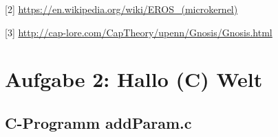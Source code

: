 \documentclass[numbers=noendperiod]{scrartcl}
\begin{document}
[2] \url{https://en.wikipedia.org/wiki/EROS_(microkernel)}

[3] \url{http://cap-lore.com/CapTheory/upenn/Gnosis/Gnosis.html}

\section*{Aufgabe 2: Hallo (C) Welt}

\subsection*{C-Programm addParam.c}

\begin{mdframed}[linecolor=bg,backgroundcolor=bg]
	\inputminted[mathescape,breaklines,linenos,numbersep=5pt,tabsize=3]{c}{addParam.c}
\end{mdframed}
\end{document}
